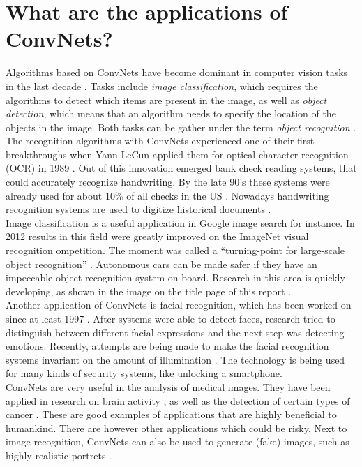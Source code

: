 
\section{What are the applications of ConvNets?}
\label{sec:app}

Algorithms based on ConvNets have become dominant in computer vision tasks in the last decade \cite{radiol}. Tasks include \textit{image classification}, which requires the algorithms to detect which items are present in the image, as well as \textit{object detection}, which means that an algorithm needs to specify the location of the objects in the image. Both tasks can be gather under the term \textit{object recognition} \cite{ilsvrc}.\\

The recognition algorithms with ConvNets experienced one of their first breakthroughs when Yann LeCun applied them for optical character recognition (OCR) in 1989 \cite{ocr}. Out of this innovation emerged bank check reading systems, that could accurately recognize handwriting. By the late 90's these systems were already used for about 10\% of all checks in the US \cite{convnet}. Nowadays handwriting recognition systems are used to digitize historical documents \cite{histdoc}.\\

Image classification is a useful application in Google image search for instance. In 2012 results in this field were greatly improved on the ImageNet visual recognition  ompetition. The moment was called a ``turning-point for large-scale object recognition'' \cite{ilsvrc}. Autonomous cars can be made safer if they have an impeccable object recognition system on board. Research in this area is quickly developing, as shown in the image on the title page of this report \cite{effps}.\\

Another application of ConvNets is facial recognition, which has been worked on since at least 1997 \cite{face}. After systems were able to detect faces, research tried to distinguish between different facial expressions \cite{express} and the next step was detecting emotions. Recently, attempts are being made to make the facial recognition systems invariant on the amount of illumination \cite{illu}. The technology is being used for many kinds of security systems, like unlocking a smartphone.\\

ConvNets are very useful in the analysis of medical images. They have been applied in research on brain activity \cite{brain}, as well as the detection of certain types of cancer \cite{cancer}. These are good examples of applications that are highly beneficial to humankind. There are however other applications which could be risky. Next to image recognition, ConvNets can also be used to generate (fake) images, such as highly realistic portrets \cite{fake}.\\

